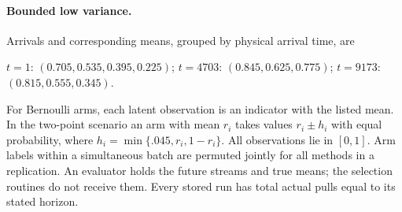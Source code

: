 \documentclass[11pt]{article}
\theoremstyle{remark}
\begin{document}
\paragraph{Bounded low variance.} Arrivals and corresponding means, grouped by physical arrival time, are

$t=1$: $(0.705,\allowbreak 0.535,\allowbreak 0.395,\allowbreak 0.225)$; $t=4703$: $(0.845,\allowbreak 0.625,\allowbreak 0.775)$; $t=9173$: $(0.815,\allowbreak 0.555,\allowbreak 0.345)$.

For Bernoulli arms, each latent observation is an indicator with the listed mean. In the two-point scenario an arm with mean $r_i$ takes values $r_i\pm h_i$ with equal probability, where $h_i=\min\{.045,r_i,1-r_i\}$. All observations lie in $[0,1]$. Arm labels within a simultaneous batch are permuted jointly for all methods in a replication. An evaluator holds the future streams and true means; the selection routines do not receive them. Every stored run has total actual pulls equal to its stated horizon.
\end{document}
